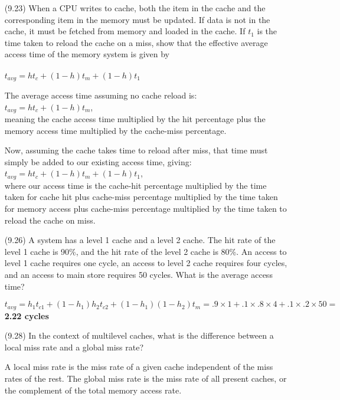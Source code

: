 \documentclass[letterpaper,10pt,titlepage]{article}
\begin{document}
\begin{enumerate}
	\item[(9.23)] When a CPU writes to cache, both the item in the cache and the
		corresponding item in the memory must be updated. If data is not in the
		cache, it must be fetched from memory and loaded in the cache. If $t_{1}$
		is the time taken to reload the cache on a miss, show that the effective
		average access time of the memory system is given by \\ \\
		$t_{avg}=ht_{c}+(1-h)t_{m}+(1-h)t_{1}$
	\item[\textbullet] The average access time assuming no cache reload is:\\
		$t_{avg}=ht_{c}+(1-h)t_{m}$,\\
		meaning the cache access time multiplied by the hit percentage plus the
		memory access time multiplied by the cache-miss percentage.
	\item[\textbullet] Now, assuming the cache takes time to reload after miss, that
		time must simply be added to our existing access time, giving:\\
		$t_{avg}=ht_{c}+(1-h)t_{m}+(1-h)t_{1}$,\\
		where our access time is the cache-hit percentage multiplied by the time
		taken for cache hit plus cache-miss percentage multiplied by the time
		taken for memory access plus cache-miss percentage multiplied by the time
		taken to reload the cache on miss.

	\item[(9.26)] A system has a level 1 cache and a level 2 cache. The hit rate of
		the level 1 cache is 90\%, and the hit rate of the level 2 cache is 80\%.
		An access to level 1 cache requires one cycle, an access to level 2 cache
		requires four cycles, and an access to main store requires 50 cycles. What
		is the average access time?
	\item[\textbullet]
		$t_{avg}=h_{1}t_{c1}+(1-h_{1})h_{2}t_{c2}+(1-h_{1})(1-h_{2})t_{m}=.9\times1+.1\times.8\times4+.1\times.2\times50=$ \textbf{2.22 cycles}

	\item[(9.28)] In the context of multilevel caches, what is the difference
		between a local miss rate and a global miss rate?
	\item[\textbullet] A local miss rate is the miss rate of a given cache independent
		of the miss rates of the rest. The global miss rate is the miss rate of
		all present caches, or the complement of the total memory access rate.


\end{enumerate}
\end{document}
